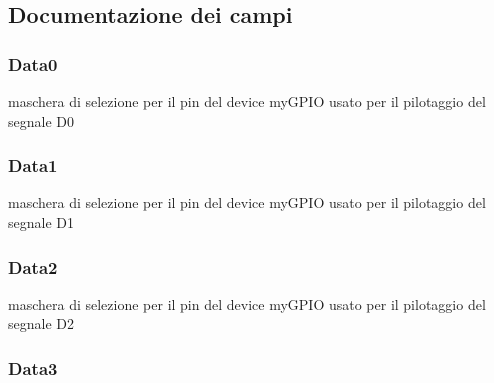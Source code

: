 \subsection{Documentazione dei campi}
\hypertarget{struct_h_d44780___l_c_d__t_a1f035dad73cbfdf86503edc70141696b}{
\subsubsection[{Data0}]{ Data0}}\label{struct_h_d44780___l_c_d__t_a1f035dad73cbfdf86503edc70141696b}
maschera di selezione per il pin del device my\+G\+P\+I\+O usato per il pilotaggio del segnale D0 \hypertarget{struct_h_d44780___l_c_d__t_a3f02fac6148faca9f183a786e0cf07d8}{
\subsubsection[{Data1}]{ Data1}}\label{struct_h_d44780___l_c_d__t_a3f02fac6148faca9f183a786e0cf07d8}
maschera di selezione per il pin del device my\+G\+P\+I\+O usato per il pilotaggio del segnale D1 \hypertarget{struct_h_d44780___l_c_d__t_af0a0822c09b4802e36ac8044447de80a}{
\subsubsection[{Data2}]{ Data2}}\label{struct_h_d44780___l_c_d__t_af0a0822c09b4802e36ac8044447de80a}
maschera di selezione per il pin del device my\+G\+P\+I\+O usato per il pilotaggio del segnale D2 \hypertarget{struct_h_d44780___l_c_d__t_a84205eb8dd4646c5e83dec2d77e78c39}{
\subsubsection[{Data3}]{ Data3}}\label{struct_h_d44780___l_c_d__t_a84205eb8dd4646c5e83dec2d77e78c39}
